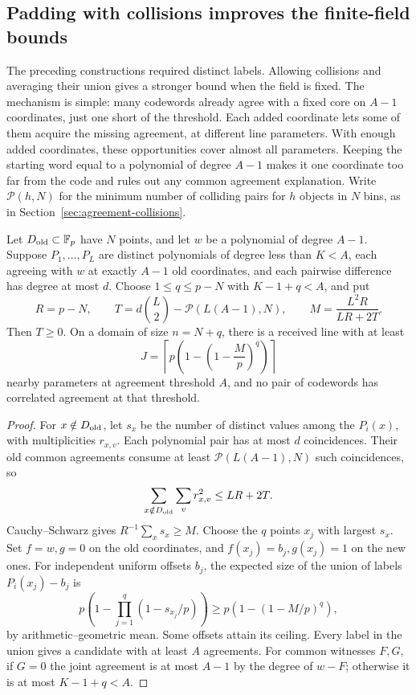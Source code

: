 \subsection{Padding with collisions improves the finite-field bounds}
\label{sec:averaged-padding}

The preceding constructions required distinct labels. Allowing collisions
and averaging their union gives a stronger bound when the field is fixed.
The mechanism is simple: many codewords already agree with a fixed core
on $A-1$ coordinates, just one short of the threshold. Each added
coordinate lets some of them acquire the missing agreement, at different
line parameters. With enough added coordinates, these opportunities
cover almost all parameters. Keeping the starting word equal to a
polynomial of degree $A-1$ makes it one coordinate too far from the code
and rules out any common agreement explanation.
Write $\mathcal P(h,N)$ for the minimum number of colliding pairs for
$h$ objects in $N$ bins, as in Section~\ref{sec:agreement-collisions}.

\begin{lemma}\label{fg:averaged-padding}
Let $D_{\rm old}\subset\mathbb F_p$ have $N$ points, and let $w$ be a polynomial
of degree $A-1$. Suppose $P_1,\ldots,P_L$ are distinct polynomials of
degree less than $K<A$, each agreeing with $w$ at exactly $A-1$ old
coordinates, and each pairwise difference has degree at most $d$.
Choose $1\le q\le p-N$ with $K-1+q<A$, and put
\[
 R=p-N,\qquad T=d\binom L2-\mathcal P(L(A-1),N),\qquad
 M=\frac{L^2R}{LR+2T}.
\]
Then $T\ge0$. On a domain of size $n=N+q$, there is a received line
with at least
\begin{equation}\label{fg:averaged-count}
 J=\left\lceil p\left(1-\left(1-\frac Mp\right)^q\right)\right\rceil
\end{equation}
nearby parameters at agreement threshold $A$, and no pair of
codewords has correlated agreement at that threshold.
\end{lemma}
\begin{proof}
For $x\notin D_{\rm old}$, let $s_x$ be the number of distinct values
among the $P_i(x)$, with multiplicities $r_{x,v}$. Each polynomial pair
has at most $d$ coincidences. Their old common agreements consume at
least $\mathcal P(L(A-1),N)$ such coincidences, so
\[
 \sum_{x\notin D_{\rm old}}\sum_v r_{x,v}^2\le LR+2T.
\]
Cauchy--Schwarz gives $R^{-1}\sum_xs_x\ge M$. Choose the $q$ points
$x_j$ with largest $s_x$. Set $f=w,g=0$ on the old coordinates, and
$f(x_j)=b_j,g(x_j)=1$ on the new ones. For independent uniform offsets
$b_j$, the expected size of the union of labels $P_i(x_j)-b_j$ is
\[
 p\left(1-\prod_{j=1}^q(1-s_{x_j}/p)\right)
 \ge p\left(1-(1-M/p)^q\right),
\]
by arithmetic--geometric mean. Some offsets attain its ceiling.
Every label in the union gives a candidate with at least $A$ agreements.
For common witnesses $F,G$, if $G=0$ the joint agreement is at most
$A-1$ by the degree of $w-F$; otherwise it is at most $K-1+q<A$.
\end{proof}


